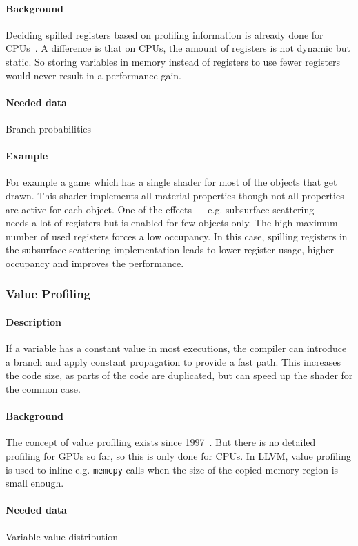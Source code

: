 \paragraph{Background} Deciding spilled registers based on profiling information is already done for CPUs~\cite{Bakhvalov2019}. A difference is that on CPUs, the amount of registers is not dynamic but static. So storing variables in memory instead of registers to use fewer registers would never result in a performance gain.
\paragraph{Needed data} Branch probabilities
\paragraph{Example} For example a game which has a single shader for most of the objects that get drawn. This shader implements all material properties though not all properties are active for each object.
One of the effects --- e.g. subsurface scattering --- needs a lot of registers but is enabled for few objects only. The high maximum number of used registers forces a low occupancy.
In this case, spilling registers in the subsurface scattering implementation leads to lower register usage, higher occupancy and improves the performance.

\subsubsection{Value Profiling}
\paragraph{Description} If a variable has a constant value in most executions, the compiler can introduce a branch and apply constant propagation to provide a fast path. This increases the code size, as parts of the code are duplicated, but can speed up the shader for the common case.
\paragraph{Background} The concept of value profiling exists since 1997~\cite{Calder1997}. But there is no detailed profiling for GPUs so far, so this is only done for CPUs. In LLVM, value profiling is used to inline e.g. \texttt{memcpy} calls when the size of the copied memory region is small enough.
\paragraph{Needed data} Variable value distribution
